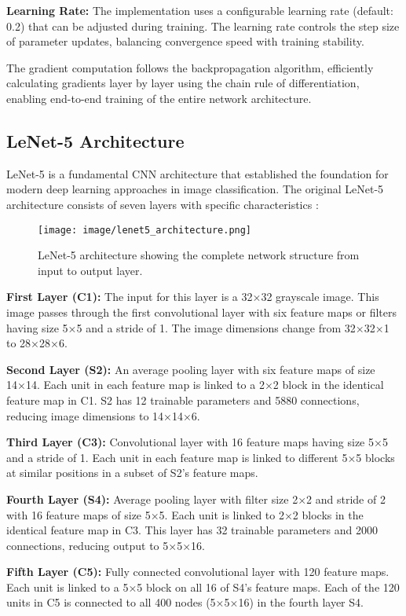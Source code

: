 \documentclass[conference]{IEEEtran}
\begin{document}
\textbf{Learning Rate:} The implementation uses a configurable learning rate (default: 0.2) that can be adjusted during training. The learning rate controls the step size of parameter updates, balancing convergence speed with training stability.

The gradient computation follows the backpropagation algorithm, efficiently calculating gradients layer by layer using the chain rule of differentiation, enabling end-to-end training of the entire network architecture.

\subsection{LeNet-5 Architecture}
LeNet-5 is a fundamental CNN architecture that established the foundation for modern deep learning approaches in image classification. The original LeNet-5 architecture consists of seven layers with specific characteristics \cite{b8}:

\begin{figure}[htbp]
\centerline{\texttt{[image: image/lenet5\_architecture.png]}}
\caption{LeNet-5 architecture showing the complete network structure from input to output layer.}
\label{fig:lenet5}
\end{figure}

\textbf{First Layer (C1):} The input for this layer is a 32×32 grayscale image. This image passes through the first convolutional layer with six feature maps or filters having size 5×5 and a stride of 1. The image dimensions change from 32×32×1 to 28×28×6.

\textbf{Second Layer (S2):} An average pooling layer with six feature maps of size 14×14. Each unit in each feature map is linked to a 2×2 block in the identical feature map in C1. S2 has 12 trainable parameters and 5880 connections, reducing image dimensions to 14×14×6.

\textbf{Third Layer (C3):} Convolutional layer with 16 feature maps having size 5×5 and a stride of 1. Each unit in each feature map is linked to different 5×5 blocks at similar positions in a subset of S2's feature maps.

\textbf{Fourth Layer (S4):} Average pooling layer with filter size 2×2 and stride of 2 with 16 feature maps of size 5×5. Each unit is linked to 2×2 blocks in the identical feature map in C3. This layer has 32 trainable parameters and 2000 connections, reducing output to 5×5×16.

\textbf{Fifth Layer (C5):} Fully connected convolutional layer with 120 feature maps. Each unit is linked to a 5×5 block on all 16 of S4's feature maps. Each of the 120 units in C5 is connected to all 400 nodes (5×5×16) in the fourth layer S4.
\end{document}
